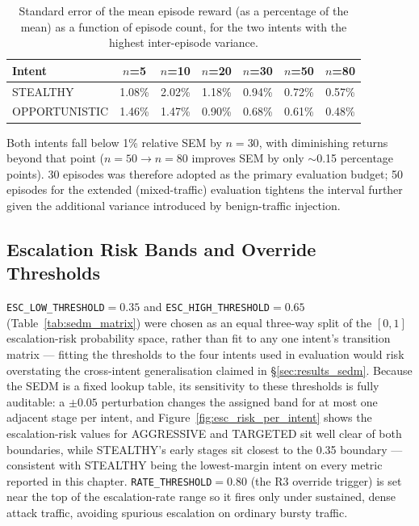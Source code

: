 \begin{table}[ht]
  \centering
  \caption{Standard error of the mean episode reward (as a percentage of
           the mean) as a function of episode count, for the two intents
           with the highest inter-episode variance.}
  \label{tab:sem_episodes}
  \begin{tabular}{lcccccc}
    \toprule
    Intent & $n$=5 & $n$=10 & $n$=20 & $n$=30 & $n$=50 & $n$=80 \\
    \midrule
    STEALTHY      & 1.08\% & 2.02\% & 1.18\% & 0.94\% & 0.72\% & 0.57\% \\
    OPPORTUNISTIC & 1.46\% & 1.47\% & 0.90\% & 0.68\% & 0.61\% & 0.48\% \\
    \bottomrule
  \end{tabular}
\end{table}

Both intents fall below 1\% relative SEM by $n=30$, with diminishing returns
beyond that point ($n=50 \to n=80$ improves SEM by only $\sim$0.15
percentage points). 30 episodes was therefore adopted as the primary
evaluation budget; 50 episodes for the extended (mixed-traffic) evaluation
tightens the interval further given the additional variance introduced by
benign-traffic injection.

\subsection{Escalation Risk Bands and Override Thresholds}

\texttt{ESC\_LOW\_THRESHOLD}$=0.35$ and \texttt{ESC\_HIGH\_THRESHOLD}$=0.65$
(Table~\ref{tab:sedm_matrix}) were chosen as an equal three-way split of the
$[0,1]$ escalation-risk probability space, rather than fit to any one
intent's transition matrix — fitting the thresholds to the four intents
used in evaluation would risk overstating the cross-intent generalisation
claimed in \S\ref{sec:results_sedm}. Because the SEDM is a fixed lookup
table, its sensitivity to these thresholds is fully auditable: a $\pm 0.05$
perturbation changes the assigned band for at most one adjacent stage per
intent, and Figure~\ref{fig:esc_risk_per_intent} shows the escalation-risk
values for AGGRESSIVE and TARGETED sit well clear of both boundaries, while
STEALTHY's early stages sit closest to the 0.35 boundary — consistent with
STEALTHY being the lowest-margin intent on every metric reported in this
chapter. \texttt{RATE\_THRESHOLD}$=0.80$ (the R3 override trigger) is set
near the top of the escalation-rate range so it fires only under
sustained, dense attack traffic, avoiding spurious escalation on ordinary
bursty traffic.

